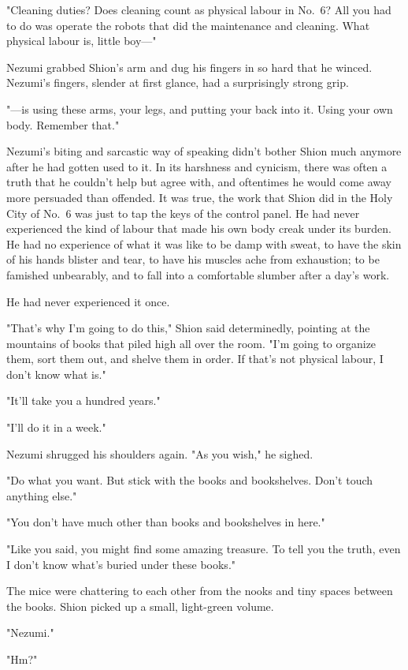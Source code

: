 "Cleaning duties? Does cleaning count as physical labour in No.~6? All
you had to do was operate the robots that did the maintenance and
cleaning. What physical labour is, little boy---"

Nezumi grabbed Shion's arm and dug his fingers in so hard that he
winced. Nezumi's fingers, slender at first glance, had a surprisingly
strong grip.

"---is using these arms, your legs, and putting your back into it. Using
your own body. Remember that."

Nezumi's biting and sarcastic way of speaking didn't bother Shion much
anymore after he had gotten used to it. In its harshness and cynicism,
there was often a truth that he couldn't help but agree with, and
oftentimes he would come away more persuaded than offended. It was true,
the work that Shion did in the Holy City of No.~6 was just to tap the
keys of the control panel. He had never experienced the kind of labour
that made his own body creak under its burden. He had no experience of
what it was like to be damp with sweat, to have the skin of his hands
blister and tear, to have his muscles ache from exhaustion; to be
famished unbearably, and to fall into a comfortable slumber after a
day's work.

He had never experienced it once.

"That's why I'm going to do this," Shion said determinedly, pointing at
the mountains of books that piled high all over the room. "I'm going to
organize them, sort them out, and shelve them in order. If that's not
physical labour, I don't know what is."

"It'll take you a hundred years."

"I'll do it in a week."

Nezumi shrugged his shoulders again. "As you wish," he sighed.

"Do what you want. But stick with the books and bookshelves. Don't touch
anything else."

"You don't have much other than books and bookshelves in here."

"Like you said, you might find some amazing treasure. To tell you the
truth, even I don't know what's buried under these books."

The mice were chattering to each other from the nooks and tiny spaces
between the books. Shion picked up a small, light-green volume.

"Nezumi."

"Hm?"

